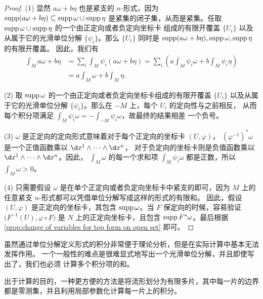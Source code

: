 \begin{proof}
  (1) 显然 $a\omega+b\eta$ 也是紧支的 $n$-形式，因为 
  $\operatorname{supp}(a\omega+b\eta)\subseteq \operatorname{supp}\omega\cup\operatorname{supp}\eta$
  是紧集的闭子集，从而是紧集。任取 $\operatorname{supp}\omega\cup\operatorname{supp}\eta$ 的一个由正定向或者负定向坐标卡
  组成的有限开覆盖 $\{U_i\}$ 以及从属于它的光滑单位分解 $\{\psi_i\}$。那么
  $\{U_i\}$ 同时是 $\operatorname{supp}(a\omega+b\eta),\operatorname{supp}\omega,\operatorname{supp}\eta$ 的有限开覆盖。
  因此，我们有
  \begin{align*}
    \int_M a\omega+b\eta&=\sum_i\int_M \psi_i(a\omega+b\eta)
    =\sum_i \left(a\int_M \psi_i\omega+b\int_M \psi_i\eta\right)\\
    &=a\int_M \omega+b\int_M \eta.
  \end{align*}

  (2) 取 $\operatorname{supp}\omega$ 的一个由正定向或者负定向坐标卡组成的有限开覆盖 $\{U_i\}$
  以及从属于它的光滑单位分解 $\{\psi_i\}$。那么在 $-M$ 上，每个 $U_i$ 的定向性与之前相反，
  从而每个积分项满足 $\int_M \psi_i\omega=-\int_{-M}\psi_i\omega$，故最终的结果相差
  一个负号。

  (3) $\omega$ 是正定向的定向形式意味着对于每个正定向的坐标卡 $(U,\varphi)$，
  $(\varphi^{-1})^*\omega$ 是一个正值函数乘以 $\d x^1\wedge\cdots\wedge \d x^n$，
  对于负定向的坐标卡则是负值函数乘以 $\d x^1\wedge\cdots\wedge \d x^n$。因此，
  $\int_M\omega$ 的每一个求和项 $\int_M\psi_i\omega$ 都是正数，所以 $\int_M\omega>0$。

  (4) 只需要假设 $\omega$ 是在单个正定向或者负定向坐标卡中紧支的即可，因为
  $M$ 上的任意紧支 $n$-形式都可以凭借单位分解写成这样的形式的有限和。
  因此，假设 $(U,\varphi)$ 是正定向的坐标卡，其包含 $\operatorname{supp}\omega$。当
  $F$ 保定向的时候，容易验证 $\bigl(F^{-1}(U),\varphi\circ F\bigr)$
  是 $N$ 上的正定向坐标卡，且包含 $\operatorname{supp} F^*\omega$。最后根据
  \autoref{prop:change of variables for top form on open set} 即可。
\end{proof}

虽然通过单位分解定义形式的积分非常便于理论分析，但是在实际计算中基本无法发挥作用。
一个一般性的难点是很难显式地写出一个光滑单位分解，并且即使写出了，我们也必须
计算多个积分项的和。

出于计算的目的，一种更方便的方法是将流形划分为有限多片，其中每一片的边界
都是零测集，并且利用局部参数化计算每一片上的积分。

